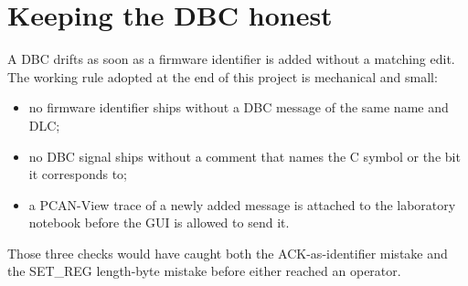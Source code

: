 \section{Keeping the DBC honest}
A DBC drifts as soon as a firmware identifier is added without a matching
edit. The working rule adopted at the end of this project is
mechanical and small:

\begin{itemize}[leftmargin=1.6em]
  \item no firmware identifier ships without a DBC message of the same
        name and DLC;
  \item no DBC signal ships without a comment that names the C symbol or
        the bit it corresponds to;
  \item a PCAN-View trace of a newly added message is attached to the
        laboratory notebook before the GUI is allowed to send it.
\end{itemize}

Those three checks would have caught both the ACK-as-identifier mistake
and the SET\_REG length-byte mistake before either reached an operator.
